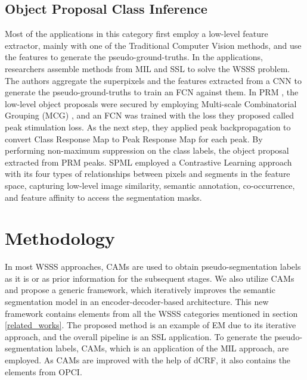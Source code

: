 \documentclass[sn-mathphys]{sn-jnl}
\theoremstyle{thmstyleone}
\theoremstyle{thmstyletwo}\newtheorem{example}{Example}\newtheorem{remark}{Remark}
\theoremstyle{thmstylethree}\newtheorem{definition}{Definition}
\begin{document}
\subsection{Object Proposal Class Inference}
\label{object_proposal_class_inference}

Most of the applications in this category first employ a low-level feature extractor, mainly with one of the Traditional Computer Vision methods, and use the features to generate the pseudo-ground-truths. In the applications, researchers assemble methods from MIL and SSL to solve the WSSS problem. The authors \cite{Kwak2017WeaklySS} aggregate the superpixels and the features extracted from a CNN to generate the pseudo-ground-truths to train an FCN against them. In PRM \cite{DBLP:journals/corr/abs-1804-00880}, the low-level object proposals were secured by employing Multi-scale Combinatorial Grouping (MCG) \cite{DBLP:journals/corr/Pont-TusetABMM15}, and an FCN was trained with the loss they proposed called peak stimulation loss. As the next step, they applied peak backpropagation to convert Class Response Map to Peak Response Map for each peak. By performing non-maximum suppression on the class labels, the object proposal extracted from PRM peaks. SPML \cite{DBLP:journals/corr/abs-2105-00957} employed a Contrastive Learning approach with its four types of relationships between pixels and segments in the feature space, capturing low-level image similarity, semantic annotation, co-occurrence, and feature affinity to access the segmentation masks.





\section{Methodology}\label{methodology}

In most WSSS approaches, CAMs are used to obtain pseudo-segmentation labels as it is or as prior information for the subsequent stages. We also utilize CAMs \cite{cam} and propose a generic framework, which iteratively improves the semantic segmentation model in an encoder-decoder-based architecture. This new framework contains elements from all the WSSS categories mentioned in section \ref{related_works}. The proposed method is an example of EM due to its iterative approach, and the overall pipeline is an SSL application. To generate the pseudo-segmentation labels, CAMs, which is an application of the MIL approach, are employed. As CAMs are improved with the help of dCRF, it also contains the elements from OPCI. 
\end{document}
